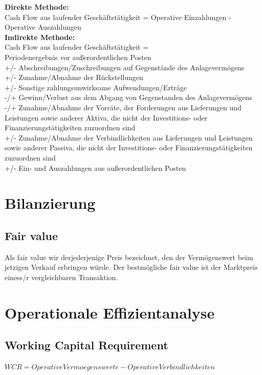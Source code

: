 \documentclass{article}
\begin{document}
\textbf{Direkte Methode:}\\
Cash Flow aus laufender Geschäftstätigkeit = Operative Einzahlungen - Operative Auszahlungen \\
\textbf{Indirekte Methode:}\\
Cash Flow aus laufender Geschäftstätigkeit = \\
Periodenergebnis vor außerordentlichen Posten\\
+/- Abschreibungen/Zuschreibungen auf Gegenstände des Anlagevermögens\\
+/- Zunahme/Abnahme der Rückstellungen\\
+/- Sonstige zahlungsunwirksame Aufwendungen/Erträge\\
-/+ Gewinn/Verlust aus dem Abgang von Gegenstanden des Anlagevermögens\\
-/+ Zunahme/Abnahme der Vorräte, der Forderungen aus Lieferungen und Leistungen sowie anderer Aktiva, die nicht der Investitions- oder Finanzierungstätigkeiten zuzuordnen sind \\
+/- Zunahme/Abnahme der Verbindlichkeiten aus Lieferungen und Leistungen sowie anderer Passiva, die nicht der Investitions- oder Finanzierungstätigkeiten zuzuordnen sind\\
+/- Ein- und Auszahlungen aus außerordentlichen Posten\\

\section{Bilanzierung}

\subsection{Fair value}

Als fair value wir derjederjenige Preis bezeichnet, den der Vermögenswert beim jetzigen Verkauf erbringen würde.
Der bestmögliche fair value ist der Marktpreis einess/r vergleichbaren Transaktion.
\section{Operationale Effizientanalyse}

\subsection{Working Capital Requirement}

$WCR = Operative Vermoegenswerte - Operative Verbindlichkeiten $ 
\end{document}

